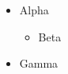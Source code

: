 \documentclass[aspectratio=169]{beamer}
\begin{document}
\begin{frame}[plain,t]
\begin{small}
\begin{itemize}
\item Alpha
\begin{itemize}\item Beta\end{itemize}
\item Gamma
\end{itemize}
\end{small}
\end{frame}
\end{document}
